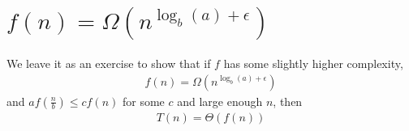 \documentclass{article}
\begin{document}
\section{$f(n) = \Omega\left(n^{\log_b(a)+\epsilon}\right)$}
\normalsize
We leave it as an exercise to show that if $f$ has some slightly
higher complexity,
\LARGE
\begin{align}
  f(n) = \Omega\left(n^{\log_b(a)+\epsilon}\right)
\end{align}
\normalsize
and $af\left(\frac{n}{b}\right) \leq cf(n)$ for some $c$ and large
enough $n$, then
\LARGE
\begin{align}
  T(n) = \Theta(f(n))
\end{align}
\end{document}

